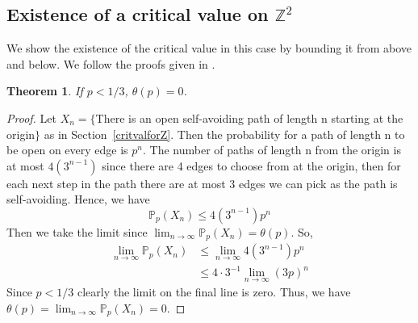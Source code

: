 \documentclass[a4paper,11pt]{article}
\newtheorem{theorem}{Theorem}[section]
\theoremstyle{definition}
\newcommand{\ints}{\mathbb{Z}}
\newcommand{\prob}{\mathbb{P}_p}
\begin{document}
\subsection {Existence of a critical value on \texorpdfstring{$\ints^2$}{ Z2}} \label{critvalZ2}
We show the existence of the critical value in this case by bounding it from above and below. We follow the proofs given in \cite{steif2011mini}.
\begin{theorem}
	If $p < 1/3$, $\theta(p) = 0$.
\end{theorem}
\begin{proof}
	Let $X_n = \{$There is an open self-avoiding path of length n starting at the origin$\}$ as in Section~\ref{critvalforZ}.
	Then the probability for a path of length n to be open on every edge is $p^n$. The number of paths of length n from the origin is at most $4(3^{n-1})$ since there are 4 edges to choose from at the origin, then for each next step in the path there are at most 3 edges we can pick as the path is self-avoiding.
	Hence, we have 
	$$\prob(X_n) \leq  4(3^{n-1})p^n$$ 
	Then we take the limit since $\lim_{n\rightarrow \infty}\prob(X_n) = \theta(p)$. So,
	\begin{align*}
		\lim_{n\rightarrow \infty}\prob(X_n) &\leq  \lim_{n\rightarrow \infty}4(3^{n-1})p^n\\
		 &\leq 4\cdot  3^{-1} \lim_{n\rightarrow \infty}(3p)^{n}
	 \end{align*}
	 Since $p < 1/3$ clearly the limit on the final line is zero. Thus, we have $\theta(p)=\lim_{n\rightarrow \infty}\prob(X_n) = 0$.
\end{proof}
\end{document}
